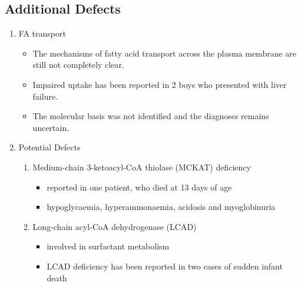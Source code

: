 \documentclass{scrartcl}
\begin{document}
\subsection{Additional Defects}
\label{sec:orgebea43d}
\begin{enumerate}
\item FA transport
\label{sec:orge4351f6}
\begin{itemize}
\item The mechanisms of fatty acid transport across the plasma membrane are still not completely clear.
\item Impaired uptake has been reported in 2 boys who presented with liver failure.
\item The molecular basis was not identified and the diagnoses remains uncertain.
\end{itemize}

\item Potential Defects
\label{sec:org8fdd40d}
\begin{enumerate}
\item Medium-chain 3-ketoacyl-CoA thiolase (MCKAT) deficiency
\label{sec:orga5f1cac}
\begin{itemize}
\item reported in one patient, who died at 13 days of age
\item hypoglycaemia, hyperammonaemia, acidosis and myoglobinuria
\end{itemize}

\item Long-chain acyl-CoA dehydrogenase (LCAD)
\label{sec:org6293bc8}
\begin{itemize}
\item involved in surfactant metabolism
\item LCAD deficiency has been reported in two cases of sudden infant death
\end{itemize}
\end{enumerate}
\end{enumerate}
\end{document}

